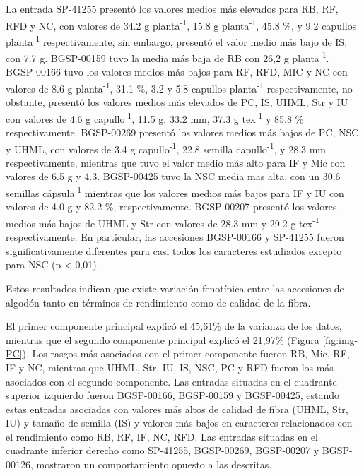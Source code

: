 \documentclass[12pt,oneside]{reedthesis}
\begin{document}
La entrada SP-41255 presentó los valores medios más elevados para RB, RF, RFD y NC, con valores de 34.2 g planta\textsuperscript{-1}, 15.8 g planta\textsuperscript{-1}, 45.8 \%, y 9.2 capullos planta\textsuperscript{-1} respectivamente, sin embargo, presentó el valor medio más bajo de IS, con 7.7 g. BGSP-00159 tuvo la media más baja de RB con 26,2 g planta\textsuperscript{-1}. BGSP-00166 tuvo los valores medios más bajos para RF, RFD, MIC y NC con valores de 8.6 g planta\textsuperscript{-1}, 31.1 \%, 3.2 y 5.8 capullos planta\textsuperscript{-1} respectivamente, no obstante, presentó los valores medios más elevados de PC, IS, UHML, Str y IU con valores de 4.6 g capullo\textsuperscript{-1}, 11.5 g, 33.2 mm, 37.3 g tex\textsuperscript{-1} y 85.8 \% respectivamente. BGSP-00269 presentó los valores medios más bajos de PC, NSC y UHML, con valores de 3.4 g capullo\textsuperscript{-1}, 22.8 semilla capullo\textsuperscript{-1}, y 28.3 mm respectivamente, mientras que tuvo el valor medio más alto para IF y Mic con valores de 6.5 g y 4.3. BGSP-00425 tuvo la NSC media mas alta, con un 30.6 semillas cápsula\textsuperscript{-1} mientras que los valores medios más bajos para IF y IU con valores de 4.0 g y 82.2 \%, respectivamente. BGSP-00207 presentó los valores medios más bajos de UHML y Str con valores de 28.3 mm y 29.2 g tex\textsuperscript{-1} respectivamente. En particular, las accesiones BGSP-00166 y SP-41255 fueron significativamente diferentes para casi todos los caracteres estudiados excepto para NSC (p \textless{} 0,01).

Estos resultados indican que existe variación fenotípica entre las accesiones de algodón tanto en términos de rendimiento como de calidad de la fibra.

El primer componente principal explicó el 45,61\% de la varianza de los datos, mientras que el segundo componente principal explicó el 21,97\% (Figura \ref{fig:img-PC}). Los rasgos más asociados con el primer componente fueron RB, Mic, RF, IF y NC, mientras que UHML, Str, IU, IS, NSC, PC y RFD fueron los más asociados con el segundo componente. Las entradas situadas en el cuadrante superior izquierdo fueron BGSP-00166, BGSP-00159 y BGSP-00425, estando estas entradas asociadas con valores más altos de calidad de fibra (UHML, Str, IU) y tamaño de semilla (IS) y valores más bajos en caracteres relacionados con el rendimiento como RB, RF, IF, NC, RFD. Las entradas situadas en el cuadrante inferior derecho como SP-41255, BGSP-00269, BGSP-00207 y BGSP-00126, mostraron un comportamiento opuesto a las descritas.
\end{document}
